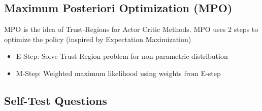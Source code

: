\subsection{Maximum Posteriori Optimization (MPO)}
MPO is the idea of Trust-Regions for Actor Critic Methods. MPO uses 2 steps to optimize the policy (inspired by Expectation Maximization)
\begin{itemize}
\item E-Step: Solve Trust Region problem for non-parametric distribution
\item M-Step: Weighted maximum likelihood using weights from E-step
\end{itemize}


\subsection{Self-Test Questions}
